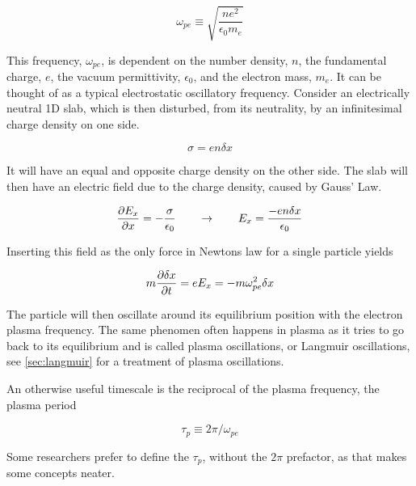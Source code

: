 		\begin{equation}
			\omega_{pe} \equiv \sqrt{\frac{ne^2}{\epsilon_0 m_e}}
		\end{equation}

		This frequency, \(\omega_{pe}\), is dependent on the number density, \(n\),
		the fundamental charge, \(e\), the vacuum permittivity, \(\epsilon_0\), and
		the electron mass, \(m_e\).
		It can be thought of as a typical electrostatic oscillatory frequency.
		Consider an electrically neutral 1D slab, which is then disturbed, from its
		neutrality, by an infinitesimal charge density on one side.

		\begin{equation}
			\sigma = en\delta x
		\end{equation}

		It will have an equal and opposite charge density on the other side. The slab
		will then have an electric field due to the charge density, caused by Gauss' Law.

		\begin{equation}
			\pdv{E_x}{x} = -\frac{\sigma}{\epsilon_0} \qquad\rightarrow\qquad
			E_x = \frac{-en\delta x}{\epsilon_0}
		\end{equation}

		Inserting this field as the only force in Newtons law for a single particle yields

		\begin{equation}
			m\pdv{\delta x}{t} = eE_x = -m\omega_{pe}^2\delta x
		\end{equation}

		The particle will then oscillate around its equilibrium position with
		the electron plasma frequency. The same phenomen often happens in plasma as
		it tries to go back to its equilibrium and is called plasma oscillations,
		or Langmuir oscillations, see \cref{sec:langmuir} for a treatment of plasma oscillations.

		An otherwise useful timescale is the reciprocal of the plasma frequency,
		the plasma period

		\begin{equation}
			\tau_p \equiv 2\pi/\omega_{pe}
		\end{equation}

		Some researchers prefer to define the \(\tau_p\), without the \(2\pi\) prefactor,
		as that makes some concepts neater.

